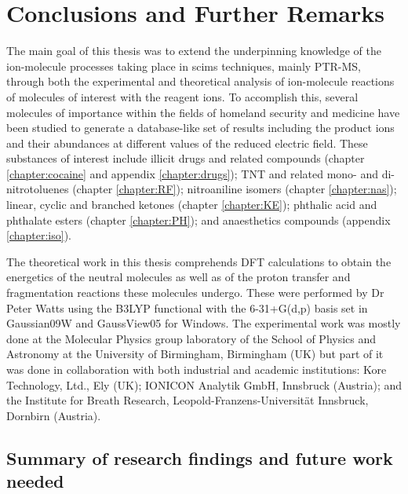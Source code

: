 \chapter{Conclusions and Further Remarks}

The main goal of this thesis was to extend the underpinning knowledge of the ion-molecule processes taking place in \acrshort{scims} techniques, mainly PTR-MS, through both the experimental and theoretical analysis of ion-molecule reactions of molecules of interest with the reagent ions. %
%
To accomplish this, several molecules of importance within the fields of homeland security and medicine have been studied to generate a database-like set of results including the product ions and their abundances at different values of the reduced electric field.
%
These substances of interest include  illicit drugs and related compounds (chapter \ref{chapter:cocaine} and appendix \ref{chapter:drugs}); 
TNT and related mono- and di- nitrotoluenes  (chapter \ref{chapter:RF});
nitroaniline isomers  (chapter \ref{chapter:nas});
linear, cyclic and branched ketones  (chapter \ref{chapter:KE}); 
phthalic acid and phthalate esters  (chapter \ref{chapter:PH}); 
and 
anaesthetics compounds  (appendix \ref{chapter:iso}).



The theoretical work in this thesis comprehends DFT calculations to obtain the energetics of the neutral molecules as well as of the proton transfer and fragmentation reactions these molecules undergo.
%
These were performed by Dr Peter Watts using the B3LYP functional with the 6-31+G(d,p) basis set in Gaussian09W and GaussView05 for Windows.
%
The experimental work was mostly done at the  Molecular Physics group laboratory of the School of Physics and Astronomy at the University of Birmingham, Birmingham (UK)
but part of it was done in collaboration with both industrial and academic institutions: 
Kore Technology, Ltd.,  Ely (UK);
IONICON Analytik GmbH, Innsbruck (Austria);
and
the Institute for Breath Research, Leopold-Franzens-Universität Innsbruck, Dornbirn (Austria).


\section{Summary of research findings and future work needed}
